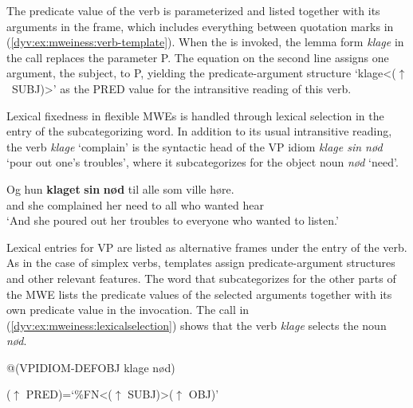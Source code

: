 \documentclass[output=paper]{langsci/langscibook}
\begin{document}
The predicate value of the verb is parameterized and listed together with its arguments in the  frame, which includes everything between quotation marks in (\ref{dyv:ex:mweiness:verb-template}).
When the  is invoked, the lemma form \emph{klage} in the  call replaces the parameter P. 
The equation on the second line assigns one argument, the subject, to P, yielding the predicate-argument  structure `klage<($\uparrow$~SUBJ)>' as the PRED value for the intransitive reading of this verb.


Lexical fixedness in flexible MWEs is handled through lexical selection in the entry of the subcategorizing word. 
In addition to its usual intransitive reading, the verb \emph{klage} `complain' is the syntactic head of the VP idiom \emph{klage sin nød} `pour out one's troubles', where it subcategorizes for the object noun \emph{nød} `need'. 

 \ea\label{dyv:ex:mweiness:klagesinnød}
\gll Og hun \textbf{klaget} \textbf{sin} \textbf{nød} til alle som ville høre. \\
     and she complained her need to all who wanted hear \\
\glt `And she poured out her troubles to everyone who wanted to listen.’
\z

Lexical entries for VP  are listed as alternative  frames under the entry of the verb.
As in the case of simplex verbs, templates assign predicate-argument structures and other relevant features.  
The word that subcategorizes for the other parts of the MWE lists the predicate values of the selected arguments together with its own predicate value in the  invocation. 
The  call in (\ref{dyv:ex:mweiness:lexicalselection}) shows that the verb \emph{klage} selects the noun \emph{nød}. 

\ea\label{dyv:ex:mweiness:lexicalselection}
{\small 
@(VPIDIOM-DEFOBJ klage nød)
}
\z

\ea\label{dyv:ex:mweiness:subcatframe}
{\small
	  ($\uparrow$ PRED)=`\%FN<($\uparrow$ SUBJ)>($\uparrow$ OBJ)'  \\
}
\z
\end{document}
